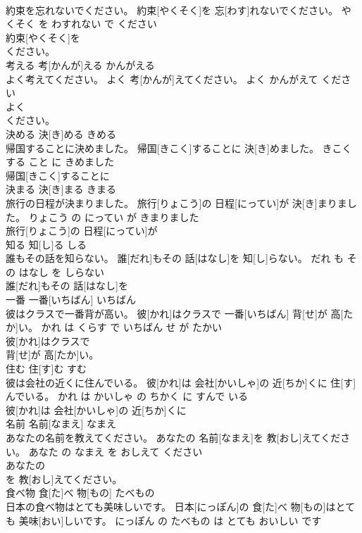 \documentclass[8pt]{extreport}
\begin{document}
\begin{CJK}{UTF8}{min}
\\	約束を忘れないでください。	約束[やくそく]を 忘[わす]れないでください。	やくそく を わすれない で ください	
\\	約束[やくそく]を
\\	ください。			
\\	考える	考[かんが]える	かんがえる	
\\	よく考えてください。	よく 考[かんが]えてください。	よく かんがえて ください	
\\	よく
\\	ください。			
\\	決める	決[き]める	きめる	
\\	帰国することに決めました。	帰国[きこく]することに 決[き]めました。	きこく する こと に きめました	
\\	帰国[きこく]することに
\\	決まる	決[き]まる	きまる	
\\	旅行の日程が決まりました。	旅行[りょこう]の 日程[にってい]が 決[き]まりました。	りょこう の にってい が きまりました	
\\	旅行[りょこう]の 日程[にってい]が
\\	知る	知[し]る	しる	
\\	誰もその話を知らない。	誰[だれ]もその 話[はなし]を 知[し]らない。	だれ も その はなし を しらない	
\\	誰[だれ]もその 話[はなし]を
\\	一番	一番[いちばん]	いちばん	
\\	彼はクラスで一番背が高い。	彼[かれ]はクラスで 一番[いちばん] 背[せ]が 高[たか]い。	かれ は くらす で いちばん せ が たかい	
\\	彼[かれ]はクラスで
\\	背[せ]が 高[たか]い。			
\\	住む	住[す]む	すむ	
\\	彼は会社の近くに住んでいる。	彼[かれ]は 会社[かいしゃ]の 近[ちか]くに 住[す]んでいる。	かれ は かいしゃ の ちかく に すんで いる	
\\	彼[かれ]は 会社[かいしゃ]の 近[ちか]くに
\\	名前	名前[なまえ]	なまえ	
\\	あなたの名前を教えてください。	あなたの 名前[なまえ]を 教[おし]えてください。	あなた の なまえ を おしえて ください	
\\	あなたの
\\	を 教[おし]えてください。			
\\	食べ物	食[た]べ 物[もの]	たべもの	
\\	日本の食べ物はとても美味しいです。	日本[にっぽん]の 食[た]べ 物[もの]はとても 美味[おい]しいです。	にっぽん の たべもの は とても おいしい です	

\end{CJK}
\end{document}
